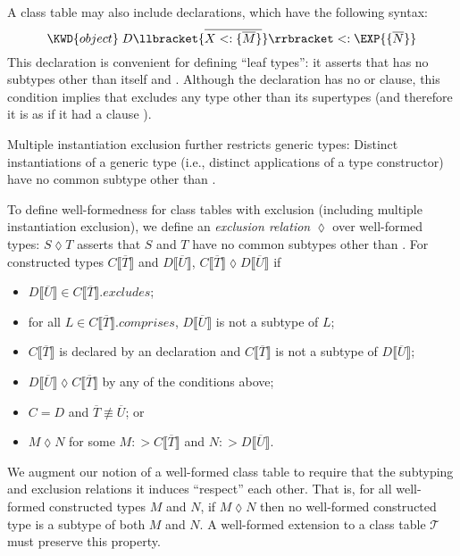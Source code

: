 \documentclass[10pt]{sigplanconf}
\renewcommand{\bar}{\overline}
\newcommand{\exc}{\mathrel{\lozenge}}
\newcommand{\myexcludes}[1]{{#1}.\textit{excludes}}
\newcommand{\mycomprises}[1]{{#1}.\textit{comprises}}
\newcommand{\extends}{\ensuremath{<:}}
\newcommand{\supertypeof}{\ensuremath{:>}}
\newcommand{\ob}[1]{\ensuremath{\llbracket {#1} \rrbracket}}
\newcommand{\obb}[1]{\ensuremath{\llbracket \bar{#1} \rrbracket}}
\newcommand{\bd}[1]{\ensuremath{\{\bar{#1}\}}}
\newcommand{\bds}[2]{\ensuremath{\bar{{#1} \extends \bd{#2}}}}
\newcommand{\tplist}[2]{\ensuremath{\ob{\bds{#1}{#2}}}}
\newcommand{\T}{\ensuremath{\mathcal{T}}}
\newcommand{\Bottom}{\TYP{Bottom}}
\begin{document}
A class table may also include  declarations, 
which have the following syntax:
\[
\KWD{object} \; D\tplist{X}{M} \extends \EXP{\lbrace\bar{N}\rbrace}
\]
This declaration is convenient for defining ``leaf types'': 
it asserts that \EXP{D\llbracket\bar{T}\rrbracket} has no subtypes 
other than itself and \Bottom.
Although the declaration has no  or  clause, 
this condition implies that \EXP{D\llbracket\bar{T}\rrbracket} 
excludes any type other than its supertypes
(and therefore it is as if it had a clause ).

Multiple instantiation exclusion 
further restricts generic types: 
Distinct instantiations of a generic type 
(i.e., distinct applications of a type constructor) 
have no common subtype other than \Bottom.

To define well-formedness for class tables with exclusion 
(including multiple instantiation exclusion),
we define an \emph{exclusion relation} $\exc$ over well-formed types:
$S \exc T$ asserts that 
$S$ and $T$ have no common subtypes other than \Bottom.
For constructed types $C\obb{T}$ and $D\obb{U}$, 
$C\obb{T} \exc D\obb{U}$ if 
\begin{itemize}

\item
$D\obb{U} \in \myexcludes{C\obb{T}}$; 

\item
for all $L \in \mycomprises{C\obb{T}}$,
$D\obb{U}$ is not a subtype of $L$; 


\item
$C\obb{T}$ is declared by an  declaration 
and $C\obb{T}$ is not a subtype of $D\obb{U}$;

\item
$D\obb{U} \exc C\obb{T}$ by any of the conditions above;

\item
$C = D$ and $\bar{T} \not\equiv \bar{U}$; or 

\item
$M \exc N$ for some $M \supertypeof C\obb{T}$ 
and $N \supertypeof D\obb{U}$.

\end{itemize} 

We augment our notion of a well-formed class table 
to require that the subtyping and exclusion relations it induces 
``respect'' each other.
That is, 
for all well-formed constructed types $M$ and $N$, 
if $M \exc N$ then no well-formed constructed type 
is a subtype of both $M$ and $N$.
A well-formed extension to a class table $\T$ 
must preserve this property.
\end{document}
